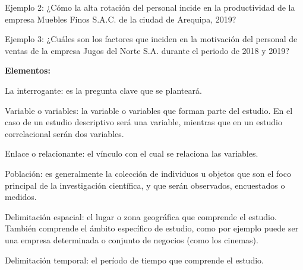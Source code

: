 Ejemplo 2: ¿Cómo la alta rotación del personal incide en la productividad de la empresa Muebles Finos S.A.C. de la ciudad de Arequipa, 2019?

Ejemplo 3: ¿Cuáles son los factores que inciden en la motivación del personal de ventas de la empresa Jugos del Norte S.A. durante el periodo de 2018 y 2019?

\textbf{Elementos:}

La interrogante: es la pregunta clave que se planteará.

Variable o variables: la variable o variables que forman parte del estudio. En el caso de un estudio descriptivo será una variable, mientras que en un estudio correlacional serán dos variables.

Enlace o relacionante: el vínculo con el cual se relaciona las variables.

Población: es generalmente la colección de individuos u objetos que son el foco principal de la investigación científica, y que serán observados, encuestados o medidos.

Delimitación espacial: el lugar o zona geográfica que comprende el estudio. También comprende el ámbito específico de estudio, como por ejemplo puede ser una empresa determinada o conjunto de negocios (como los cinemas).

Delimitación temporal: el período de tiempo que comprende el estudio.




